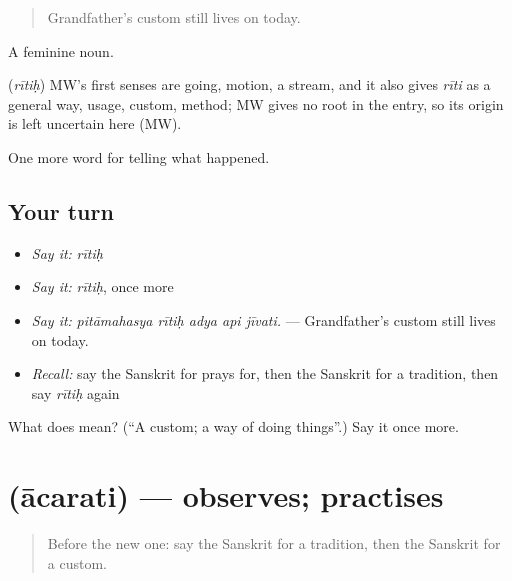 \begin{quote}
Grandfather's custom still lives on today.
\end{quote}

A feminine noun.

\begin{cousinweb}
\textbf{} (\emph{rītiḥ}) MW's first senses are going, motion, a stream, and it also gives \emph{rīti} as a general way, usage, custom, method; MW gives no root in the entry, so its origin is left uncertain here (MW).
\end{cousinweb}

\begin{grammarlens}[title={What you've built}]
One more word for telling what happened.
\end{grammarlens}

\subsection*{Your turn}
\begin{itemize}
\raggedright
  \item \emph{Say it:} \emph{rītiḥ}
  \item \emph{Say it:} \emph{rītiḥ}, once more
  \item \emph{Say it:} \emph{pitāmahasya rītiḥ adya api jīvati.} — Grandfather's custom still lives on today.
  \item \emph{Recall:} say the Sanskrit for prays for, then the Sanskrit for a tradition, then say \emph{rītiḥ} again
\end{itemize}

\begin{tcolorbox}[breakable,colback=teal!4,colframe=teal!35!black,title={Before you move on}]
What does  mean? (\textquotedblleft{}A custom; a way of doing things\textquotedblright{}.) Say it once more.
\end{tcolorbox}
\section[\texorpdfstring{\sk{आचरति} (ācarati)}{आचरति (ācarati)}]{ (ācarati) — observes; practises}

\label{lesson:SA-C330-acarati}



\begin{quote}
Before the new one: say the Sanskrit for a tradition, then the Sanskrit for a custom.
\end{quote}

